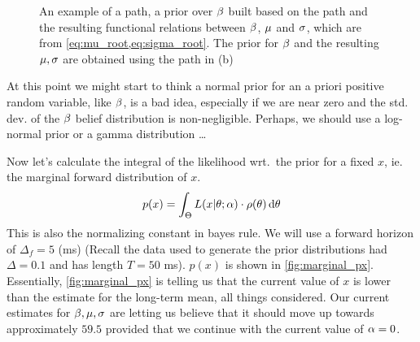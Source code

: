 \begin{figure}[h]
\begin{center}
\caption[labelInTOC]{An example of a path, a prior over $\beta$ built based on
the path and the resulting functional relations between $\beta$, ${\mu }$ and $\sigma$,
which are from \cref{eq:mu_root,eq:sigma_root}. The prior for $\beta$ and the
resulting ${\mu },\sigma$ are obtained using the path in (b)}
\label{fig:prior_mu_sigma}
\end{center}
\end{figure}
At this point we might start to think a normal prior for an a priori positive
random variable, like $\beta$, is a bad idea, especially if we are near zero and the std.
dev. of the $\beta$ belief distribution is non-negligible. Perhaps, we should use
a log-normal prior or a gamma distribution \ldots


Now let's calculate the integral of the likelihood wrt.\ the prior for a fixed
$x$, ie. the marginal forward distribution of $x$. $$ p(x) = \int_\Theta
L(x|{ \theta};\alpha)\cdot \rho({ \theta}) \, \mathrm{d} { \theta} $$ This is also the normalizing constant
in bayes rule. We will use a forward horizon of  $\Delta_f = 5$ (ms) (Recall the
data used to generate the prior distributions had $\Delta = 0.1$ and has length
$T = 50$ ms). $p(x)$ is shown in \cref{fig:marginal_px}. Essentially,
\cref{fig:marginal_px} is telling us that the current value of $x$ is lower than
the estimate for the long-term mean, all things considered. Our current
estimates for $\beta, {\mu }, \sigma$ are letting us believe that it should move up
towards approximately $59.5$ provided that we continue with the
current value of $\alpha=0$. 


